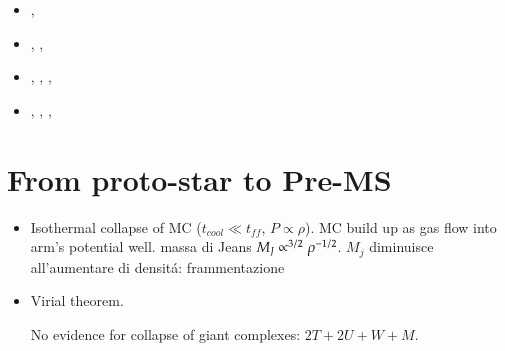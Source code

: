 \begin{itemize}
    \item {}, \xdiminuisce{\tau}
    \item {}, , 
    \item {}, , , \xaumenta{\tau}
    \item {}, , , \xdiminuisce{\tau}
\end{itemize}

\section{From proto-star to Pre-MS}

\begin{itemize}
\item Isothermal collapse of MC ($t_{cool}\ll t_{ff}$, $P\propto\rho$). MC build up as gas flow into arm's potential well. massa di Jeans $M_J\propto^{3/2}\rho^{-1/2}$. $M_j$ diminuisce all'aumentare di densit\'a: frammentazione
\item Virial theorem.






No evidence for collapse of giant complexes: $2T+2U+W+M$.





\end{itemize}
